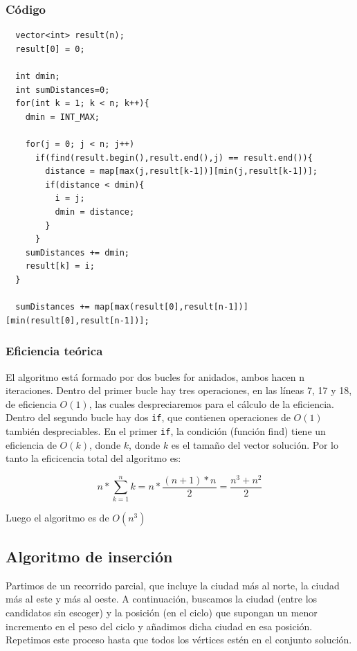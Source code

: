 \documentclass[a4]{article}
\begin{document}
\subsubsection{Código}

\begin{lstlisting}
  vector<int> result(n);
  result[0] = 0;

  int dmin;
  int sumDistances=0;
  for(int k = 1; k < n; k++){
    dmin = INT_MAX;

    for(j = 0; j < n; j++)
      if(find(result.begin(),result.end(),j) == result.end()){
        distance = map[max(j,result[k-1])][min(j,result[k-1])];
        if(distance < dmin){
          i = j;
          dmin = distance;
        }
      }
    sumDistances += dmin;
    result[k] = i;
  }
  
  sumDistances += map[max(result[0],result[n-1])][min(result[0],result[n-1])];  
\end{lstlisting}

\subsubsection{Eficiencia teórica}

El algoritmo está formado por dos bucles for anidados, ambos hacen n iteraciones. Dentro del primer bucle hay tres operaciones, en las líneas 7, 17 y 18, de eficiencia $O(1)$, las cuales despreciaremos para el cálculo de la eficiencia. Dentro del segundo bucle hay dos \verb-if-, que contienen operaciones de $O(1)$ también despreciables. En el primer \verb-if-, la condición (función find) tiene un eficiencia de $O(k)$, donde $k$, donde $k$ es el tamaño del vector solución. Por lo tanto la eficicencia total del algoritmo es:

$$n*\sum_{k=1}^{n}k = n*\frac{(n+1)*n}{2} = \frac{n^3+n^2}{2}$$

Luego el algoritmo es de $O(n^3)$
  
\subsection{Algoritmo de inserción}

Partimos de un recorrido parcial, que incluye la ciudad más al norte,
la ciudad más al este y más al oeste. A continuación, buscamos la
ciudad (entre los candidatos sin escoger) y la posición (en el ciclo)
que supongan un menor incremento en el peso del ciclo y añadimos dicha
ciudad en esa posición. Repetimos este proceso hasta que todos los
vértices estén en el conjunto solución.
\end{document}
